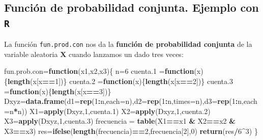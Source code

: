 \documentclass[]{book}
\newenvironment{Shaded}{\begin{snugshade}}{\end{snugshade}}
\newcommand{\ControlFlowTok}[1]{\textcolor[rgb]{0.13,0.29,0.53}{\textbf{#1}}}
\newcommand{\DataTypeTok}[1]{\textcolor[rgb]{0.13,0.29,0.53}{#1}}
\newcommand{\DecValTok}[1]{\textcolor[rgb]{0.00,0.00,0.81}{#1}}
\newcommand{\FloatTok}[1]{\textcolor[rgb]{0.00,0.00,0.81}{#1}}
\newcommand{\KeywordTok}[1]{\textcolor[rgb]{0.13,0.29,0.53}{\textbf{#1}}}
\newcommand{\NormalTok}[1]{#1}
\newcommand{\OperatorTok}[1]{\textcolor[rgb]{0.81,0.36,0.00}{\textbf{#1}}}
\newcommand{\StringTok}[1]{\textcolor[rgb]{0.31,0.60,0.02}{#1}}
\begin{document}
\hypertarget{funciuxf3n-de-probabilidad-conjunta.-ejemplo-con-r-8}{%
\subsection{\texorpdfstring{Función de probabilidad conjunta. Ejemplo con \texttt{R}}{Función de probabilidad conjunta. Ejemplo con R}}\label{funciuxf3n-de-probabilidad-conjunta.-ejemplo-con-r-8}}

La función \texttt{fun.prod.con} nos da la \textbf{función de probabilidad conjunta} de la variable aleatoria \(\mathbf{X}\) cuando lanzamos un dado tres veces:

\begin{Shaded}
\begin{Highlighting}[]
\NormalTok{fun.prob.con=}\ControlFlowTok{function}\NormalTok{(x1,x2,x3)\{}
\NormalTok{  n=}\DecValTok{6}
\NormalTok{  cuenta}\FloatTok{.1}\NormalTok{ =}\ControlFlowTok{function}\NormalTok{(x)\{}\KeywordTok{length}\NormalTok{(x[x}\OperatorTok{==}\DecValTok{1}\NormalTok{])\}}
\NormalTok{  cuenta}\FloatTok{.2}\NormalTok{ =}\ControlFlowTok{function}\NormalTok{(x)\{}\KeywordTok{length}\NormalTok{(x[x}\OperatorTok{==}\DecValTok{2}\NormalTok{])\}}
\NormalTok{  cuenta}\FloatTok{.3}\NormalTok{ =}\ControlFlowTok{function}\NormalTok{(x)\{}\KeywordTok{length}\NormalTok{(x[x}\OperatorTok{==}\DecValTok{3}\NormalTok{])\}}
\NormalTok{  Dxyz=}\KeywordTok{data.frame}\NormalTok{(}\DataTypeTok{d1=}\KeywordTok{rep}\NormalTok{(}\DecValTok{1}\OperatorTok{:}\NormalTok{n,}\DataTypeTok{each=}\NormalTok{n),}\DataTypeTok{d2=}\KeywordTok{rep}\NormalTok{(}\DecValTok{1}\OperatorTok{:}\NormalTok{n,}\DataTypeTok{times=}\NormalTok{n),}\DataTypeTok{d3=}\KeywordTok{rep}\NormalTok{(}\DecValTok{1}\OperatorTok{:}\NormalTok{n,}\DataTypeTok{each=}\NormalTok{n}\OperatorTok{*}\NormalTok{n))}
\NormalTok{  X1=}\KeywordTok{apply}\NormalTok{(Dxyz,}\DecValTok{1}\NormalTok{,cuenta}\FloatTok{.1}\NormalTok{)}
\NormalTok{  X2=}\KeywordTok{apply}\NormalTok{(Dxyz,}\DecValTok{1}\NormalTok{,cuenta}\FloatTok{.2}\NormalTok{)}
\NormalTok{  X3=}\KeywordTok{apply}\NormalTok{(Dxyz,}\DecValTok{1}\NormalTok{,cuenta}\FloatTok{.3}\NormalTok{)}
\NormalTok{  frecuencia =}\StringTok{ }\KeywordTok{table}\NormalTok{(X1}\OperatorTok{==}\NormalTok{x1 }\OperatorTok{&}\StringTok{ }\NormalTok{X2}\OperatorTok{==}\NormalTok{x2 }\OperatorTok{&}\StringTok{ }\NormalTok{X3}\OperatorTok{==}\NormalTok{x3)}
\NormalTok{  res=}\KeywordTok{ifelse}\NormalTok{(}\KeywordTok{length}\NormalTok{(frecuencia)}\OperatorTok{==}\DecValTok{2}\NormalTok{,frecuencia[}\DecValTok{2}\NormalTok{],}\DecValTok{0}\NormalTok{)}
  \KeywordTok{return}\NormalTok{(res}\OperatorTok{/}\DecValTok{6}\OperatorTok{^}\DecValTok{3}\NormalTok{)}
\NormalTok{\}}
\end{Highlighting}
\end{Shaded}
\end{document}
